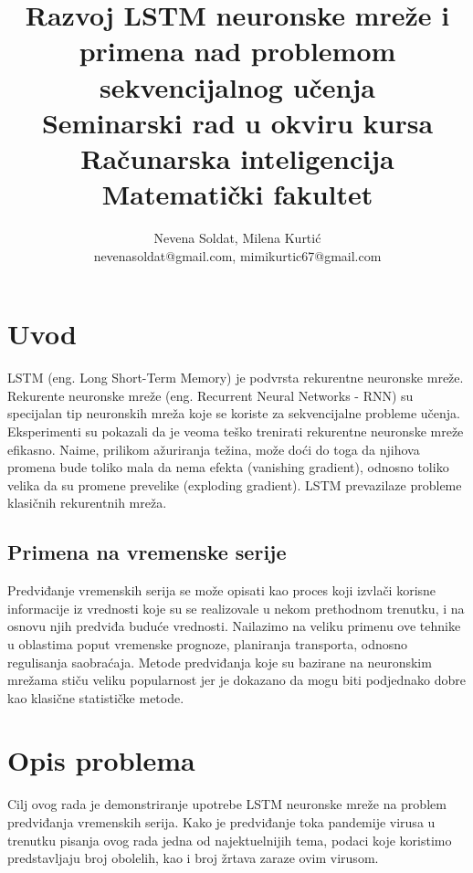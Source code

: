 \documentclass[a4paper]{article}
\begin{document}
\title{Razvoj LSTM neuronske mreže i primena nad problemom sekvencijalnog učenja\\ \small{Seminarski rad u okviru kursa\\Računarska inteligencija\\ Matematički fakultet}}

\author{Nevena Soldat, Milena Kurtić\\ nevenasoldat@gmail.com, mimikurtic67@gmail.com}


\maketitle

\abstract{

}

\tableofcontents

\newpage

\section{Uvod}
\label{sec:uvod}
LSTM (eng. Long Short-Term Memory) je podvrsta rekurentne neuronske mreže. Rekurente neuronske mreže (eng. Recurrent Neural Networks - RNN) su specijalan tip neuronskih mreža koje se koriste za sekvencijalne probleme učenja. Eksperimenti su pokazali da je veoma teško trenirati rekurentne neuronske mreže efikasno. Naime, prilikom ažuriranja težina, može doći do toga da njihova promena bude toliko mala da nema efekta (vanishing gradient), odnosno toliko velika da su promene prevelike (exploding gradient). LSTM prevazilaze probleme klasičnih rekurentnih mreža. 

\subsection{Primena na vremenske serije}
Predviđanje vremenskih serija se može opisati kao proces koji izvlači korisne informacije iz vrednosti koje su se realizovale u nekom prethodnom trenutku, i na osnovu njih predviđa buduće vrednosti. Nailazimo na veliku primenu ove tehnike u oblastima poput vremenske prognoze, planiranja transporta, odnosno regulisanja saobraćaja. Metode predviđanja koje su bazirane na neuronskim mrežama stiču veliku popularnost jer je dokazano da mogu biti podjednako dobre kao klasične statističke metode. 

\section{Opis problema}
Cilj ovog rada je demonstriranje upotrebe LSTM neuronske mreže na problem predviđanja vremenskih serija. Kako je predviđanje toka pandemije virusa u trenutku pisanja ovog rada jedna od najektuelnijih tema, podaci koje koristimo predstavljaju broj obolelih, kao i broj žrtava zaraze ovim virusom.  
\end{document}
